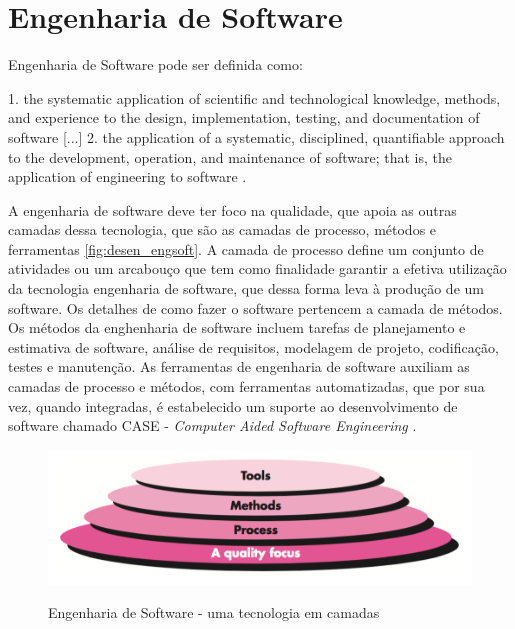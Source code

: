 \clearpage
\section{Engenharia de Software}

Engenharia de Software pode ser definida como:
\begin{citacao}[english]
1. the systematic application of scientific and technological knowledge, methods, and experience to the design,
implementation, testing, and documentation of software [...]  2. the application
of a systematic, disciplined, quantifiable approach to the development, operation,
and maintenance of software; that is, the application of engineering to software \cite{IEEE2010}.
\end{citacao}

A engenharia de software deve ter foco na qualidade, que apoia as outras camadas
dessa tecnologia, que são as camadas de processo, métodos e ferramentas \autoref{fig:desen_engsoft}.
A camada de processo define um conjunto de atividades ou um arcabouço que tem
como finalidade garantir a efetiva utilização da tecnologia engenharia de software, que dessa forma
leva à produção de um software. Os detalhes de como fazer o software pertencem
a camada de métodos. Os métodos da enghenharia de software incluem tarefas de planejamento
e estimativa de software, análise de requisitos, modelagem de projeto, codificação,
testes e manutenção. As ferramentas de engenharia de software auxiliam as camadas de
processo e métodos, com ferramentas automatizadas, que por sua vez, quando integradas,
é estabelecido um suporte ao desenvolvimento de software chamado CASE -
\textit{Computer Aided Software Engineering} \cite{Pressman2009, Sommerville2006}.

\begin{figure}[b]
  \centering
  \caption{Engenharia de Software - uma tecnologia em camadas}
  \includegraphics[scale=0.3]{imagens/desenv_engsoft2}
  \label{fig:desen_engsoft}
\end{figure}

